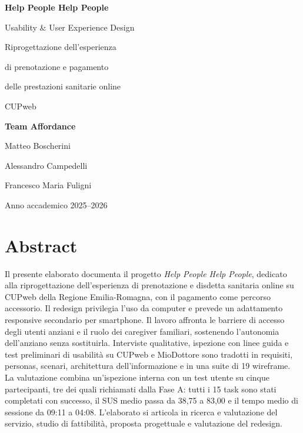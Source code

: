 \documentclass[11pt,a4paper,oneside,openany]{report}
\begin{document}
\hypersetup{pageanchor=false}

\begin{titlepage}
  \centering
  \null\vfill
  {\Huge\bfseries\color{headingcolor} Help People Help People\par}
  \medskip
  {\Large Usability \& User Experience Design\par}
  \bigskip
  {\LARGE Riprogettazione dell'esperienza\par di prenotazione e pagamento\par delle prestazioni sanitarie online\par}
  \medskip
  {\Large\color{headingcolor} CUPweb\par}
  \vfill
  {\large\bfseries Team Affordance\par}
  \medskip
  Matteo Boscherini\par
  Alessandro Campedelli\par
  Francesco Maria Fuligni\par
  \vfill
  Anno accademico 2025--2026\par
\end{titlepage}

\clearpage
{}
\hypersetup{pageanchor=true}
\section*{Abstract}
Il presente elaborato documenta il progetto \emph{Help People Help People},
dedicato alla riprogettazione dell'esperienza di prenotazione e disdetta
sanitaria online su CUPweb della Regione Emilia-Romagna, con il pagamento
come percorso accessorio. Il redesign privilegia l'uso da computer e prevede
un adattamento responsive secondario per smartphone. Il lavoro affronta le
barriere di accesso degli utenti anziani e il ruolo dei caregiver familiari,
sostenendo l'autonomia dell'anziano senza sostituirla. Interviste qualitative,
ispezione con linee guida e test preliminari di usabilità su CUPweb e
MioDottore sono tradotti in requisiti, personas, scenari, architettura
dell'informazione e in una suite di 19 wireframe. La valutazione combina
un'ispezione interna con un test utente su cinque partecipanti, tre dei quali
richiamati dalla Fase A: tutti i 15 task sono stati completati con successo,
il SUS medio passa da 38,75 a 83,00 e il tempo medio di sessione da 09:11 a
04:08. L'elaborato si articola in ricerca e valutazione del
servizio, studio di fattibilità, proposta progettuale e valutazione del
redesign.

\clearpage
\begingroup
\small
\tableofcontents
\endgroup
\end{document}
